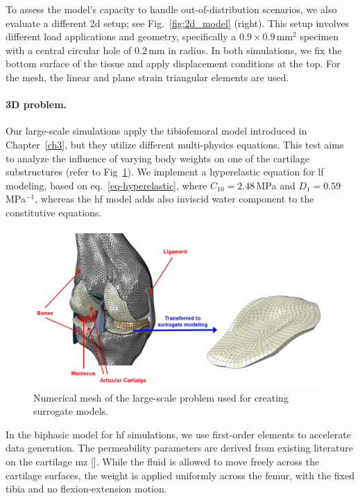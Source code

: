 To assess the model's capacity to handle out-of-distribution scenarios, we also evaluate a different \ac{2d} setup; see Fig.~\ref{fig:2d_model} (right). This setup involves different load applications and geometry, specifically a $0.9 \times 0.9$\,mm$^2$ specimen with a central circular hole of $0.2$\,mm in radius. In both simulations, we fix the bottom surface of the tissue and apply displacement conditions at the top. For the mesh, the linear and plane strain triangular elements are used.

\paragraph{3D problem.} Our large-scale simulations apply the tibiofemoral model introduced in Chapter~\ref{ch3}, but they utilize different multi-physics equations. This test aims to analyze the influence of varying body weights on one of the cartilage substructures (refer to Fig~\ref{fig:3d_model}). We implement a hyperelastic equation for \ac{lf} modeling, based on eq.~\ref{eq-hyperelastic}, where $C_{10} = 2.48$\,MPa and $D_1 = 0.59$\,MPa$^{-1}$, whereas the \ac{hf} model adds also inviscid water component to the constitutive equations.
%
\begin{figure}\centering
\includegraphics[width=\linewidth]{3D_model.png}
\caption{Numerical mesh of the large-scale problem used for creating surrogate models.\label{fig:3d_model}}
\end{figure}

In the biphasic model for \ac{hf} simulations, we use first-order elements to accelerate data generation. The permeability parameters are derived from existing literature on the cartilage \ac{mz} [\cite{sajjadinia2019,stender2016}]. While the fluid is allowed to move freely across the cartilage surfaces, the weight is applied uniformly across the femur, with the fixed tibia and no flexion-extension motion.

